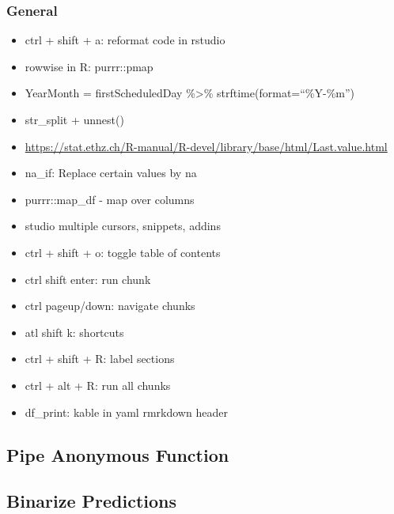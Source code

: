 \documentclass[]{book}
\newenvironment{Shaded}{\begin{snugshade}}{\end{snugshade}}
\newcommand{\StringTok}[1]{\textcolor[rgb]{0.31,0.60,0.02}{#1}}
\newcommand{\ControlFlowTok}[1]{\textcolor[rgb]{0.13,0.29,0.53}{\textbf{#1}}}
\newcommand{\OperatorTok}[1]{\textcolor[rgb]{0.81,0.36,0.00}{\textbf{#1}}}
\newcommand{\NormalTok}[1]{#1}
\theoremstyle{definition}
\theoremstyle{definition}
\theoremstyle{definition}
\theoremstyle{remark}
\begin{document}
\subsubsection{General}\label{general-6}

\begin{itemize}
\item
  ctrl + shift + a: reformat code in rstudio
\item
  rowwise in R: purrr::pmap
\item
  YearMonth = firstScheduledDay \%\textgreater{}\%
  strftime(format=``\%Y-\%m'')
\item
  str\_split + unnest()
\item
  \url{https://stat.ethz.ch/R-manual/R-devel/library/base/html/Last.value.html}
\item
  na\_if: Replace certain values by na
\item
  purrr::map\_df - map over columns
\item
  studio multiple cursors, snippets, addins
\item
  ctrl + shift + o: toggle table of contents
\item
  ctrl shift enter: run chunk
\item
  ctrl pageup/down: navigate chunks
\item
  atl shift k: shortcuts
\item
  ctrl + shift + R: label sections
\item
  ctrl + alt + R: run all chunks
\item
  df\_print: kable in yaml rmrkdown header
\end{itemize}

\subsection{Pipe Anonymous Function}\label{pipe-anonymous-function}

\begin{Shaded}
\end{Shaded}

\subsection{Binarize Predictions}\label{binarize-predictions}
\end{document}

